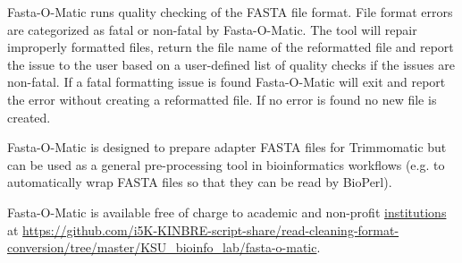 Fasta-O-Matic runs quality checking of the FASTA file format. File format errors are categorized as fatal or non-fatal by Fasta-O-Matic. The tool will repair improperly formatted files, return the file name of the reformatted file and report the issue to the user based on a user-defined list of quality checks if the issues are non-fatal. If a fatal formatting issue is found Fasta-O-Matic will exit and report the error without creating a reformatted file. If no error is found no new file is created.

Fasta-O-Matic is designed to prepare adapter FASTA files for Trimmomatic but can be used as a general pre-processing tool in bioinformatics workflows (e.g. to automatically wrap FASTA files so that they can be read by BioPerl).

Fasta-O-Matic is available free of charge to academic and non-profit \href{http://}{institutions} at \url{https://github.com/i5K-KINBRE-script-share/read-cleaning-format-conversion/tree/master/KSU\_bioinfo\_lab/fasta-o-matic}.
  
  